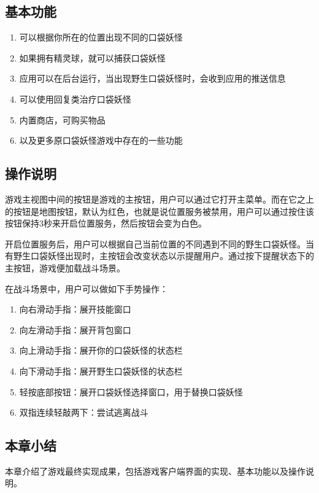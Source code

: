 \documentclass{article}
\begin{document}
\begin{CJK}{UTF8}{gbsn}
	\subsection{基本功能}
  \begin{enumerate}
    \item 可以根据你所在的位置出现不同的口袋妖怪
    \item 如果拥有精灵球，就可以捕获口袋妖怪
    \item 应用可以在后台运行，当出现野生口袋妖怪时，会收到应用的推送信息
    \item 可以使用回复类治疗口袋妖怪
    \item 内置商店，可购买物品
    \item 以及更多原口袋妖怪游戏中存在的一些功能
  \end{enumerate}

	\subsection{操作说明}
  游戏主视图中间的按钮是游戏的主按钮，用户可以通过它打开主菜单。而在它之上的按钮是地图按钮，默认为红色，也就是说位置服务被禁用，用户可以通过按住该按钮保持3秒来开启位置服务，然后按钮会变为白色。

  开启位置服务后，用户可以根据自己当前位置的不同遇到不同的野生口袋妖怪。当有野生口袋妖怪出现时，主按钮会改变状态以示提醒用户。通过按下提醒状态下的主按钮，游戏便加载战斗场景。

  在战斗场景中，用户可以做如下手势操作：

  \begin{enumerate}
    \item 向右滑动手指：展开技能窗口
    \item 向左滑动手指：展开背包窗口
    \item 向上滑动手指：展开你的口袋妖怪的状态栏
    \item 向下滑动手指：展开野生口袋妖怪的状态栏
    \item 轻按底部按钮：展开口袋妖怪选择窗口，用于替换口袋妖怪
    \item 双指连续轻敲两下：尝试逃离战斗
  \end{enumerate}

	\subsection{本章小结}
  本章介绍了游戏最终实现成果，包括游戏客户端界面的实现、基本功能以及操作说明。



\end{CJK}
\end{document}
